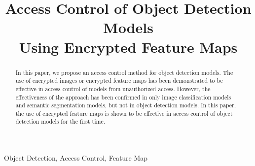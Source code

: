 \documentclass[conference,10pt,a4paper]{IEEEtran}
\begin{document}
\title{Access Control of Object Detection Models \\ Using Encrypted Feature Maps\\
}

\author{
\and
{}
\and 
{}
\and
{}
\and

}

\maketitle

\begin{abstract}
In this paper, we propose an access control method for object detection models. The use of encrypted images or encrypted feature maps has been demonstrated to be effective in access control of models from unauthorized access. However, the effectiveness of the approach has been confirmed in only image classification models and semantic segmentation models, but not in object detection models. In this paper, the use of encrypted feature maps is shown to be effective in access control of object detection models for the first time.
\end{abstract}

\begin{IEEEkeywords}
Object Detection, Access Control, Feature Map
\end{IEEEkeywords}
\end{document}
